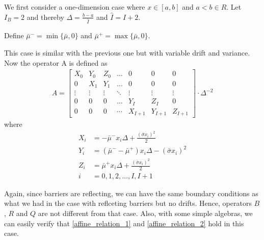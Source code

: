 \documentclass[11pt]{article}
\begin{document}
We first consider a one-dimension case where $x\in [a, b]$ and $a<b\in R$. Let $I_B = 2$ and thereby $\Delta  = \frac{b-a}{\hat{I}}$ and $\hat{I} = I+2$. 

Define $\bar{\mu}^- = \min\{\bar{\mu}, 0\}$ and $\bar{\mu}^+  = \max\{\bar{\mu}, 0\}$.

This case is similar with the previous one but with variable drift and variance. Now the operator A is defined as
\begin{align}
A = \begin{bmatrix}
X_0&Y_0&Z_0&\dots&0&0&0\\
0&X_1&Y_1&\dots&0&0&0\\
\vdots&\vdots&\vdots&\ddots&\vdots&\vdots&\vdots\\
0&0&0&\dots&Y_I&Z_I&0\\
0&0&0&\cdots&X_{I+1}&Y_{I+1}&Z_{I+1}
\end{bmatrix}\cdot \Delta^{-2}\nonumber
\end{align}
where
\begin{align*}
X_i &= -\bar{\mu}^-x_i\Delta+\frac{(\bar{\sigma}x_i)^2}{2}\\
Y_i &= (\bar{\mu}^--\bar{\mu}^+)x_i\Delta-(\bar{\sigma}x_i)^2\\
Z_i &=\bar{\mu}^+x_i\Delta+\frac{(\bar{\sigma}x_i)^2}{2}\\
i & = 0, 1, 2,\dots, I, I+1
\end{align*}

Again, since barriers are reflecting, we can have the same boundary conditions as what we had in the case with reflceting barriers but no drifts. Hence, operators $B$, $R$ and $Q$ are not different from that case. Also, with some simple algebras, we can easily verify that \eqref{affine_relation_1} and \eqref{affine_relation_2} hold in this case.
\end{document}
